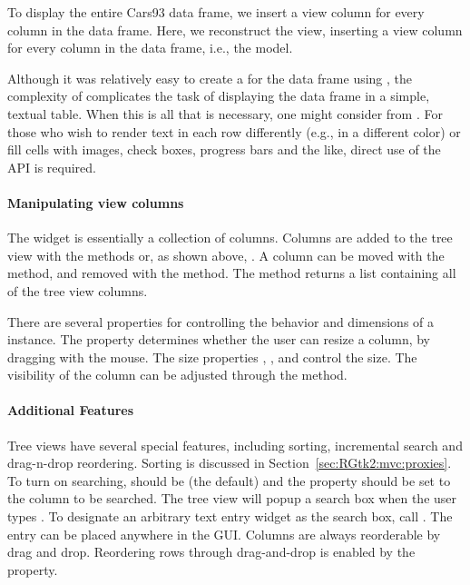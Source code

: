To display the entire Cars93 data frame, we insert a view column for
every column in the data frame. Here, we reconstruct the view, inserting
a view column for every column in the data frame, i.e., the model.
\begin{Schunk}
\end{Schunk}
%
Although it was relatively easy to create a  for
the data frame using , the complexity of
 complicates the task of displaying the data frame
in a simple, textual table. When this is all that is necessary, one
might consider  from . For those
who wish to render text in each row differently (e.g., in a different
color) or fill cells with images, check boxes, progress bars and the
like, direct use of the  API is required.

\paragraph{Manipulating view columns}
The  widget is essentially a collection of
columns. Columns are added to the tree view with the methods
 or, as shown above,
.  A column can be
moved with the  method, and
removed with the  method. The
 method returns a list containing all
of the tree view columns.

There are several properties for controlling the behavior and
dimensions of a  instance. The property
 determines whether the user can resize a column, by
dragging with the mouse. The size properties ,
, and  control the size. The
visibility of the column can be adjusted through the
 method.

\paragraph{Additional Features}

Tree views have several special features, including sorting,
incremental search and drag-n-drop reordering. Sorting is discussed in
Section~\ref{sec:RGtk2:mvc:proxies}. To turn on searching,
 should be  (the default) and the
 property should be set to the column to be
searched. The tree view will popup a search box when the user types
. To designate an arbitrary text entry widget as the
search box, call . The entry can
be placed anywhere in the GUI. Columns are always reorderable by drag
and drop. Reordering rows through drag-and-drop is enabled by the
 property.

